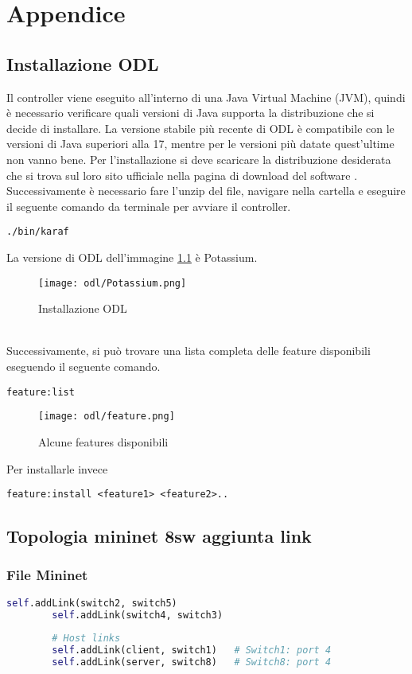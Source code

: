 \chapter{Appendice}

\section {Installazione ODL}
Il controller viene eseguito all'interno di una Java Virtual Machine (JVM), quindi è necessario verificare quali versioni di Java supporta la distribuzione che si decide di installare.
La versione stabile più recente di ODL è compatibile con le versioni di Java superiori alla 17, mentre per le versioni più datate quest'ultime non vanno bene. 
Per l'installazione si deve scaricare la distribuzione desiderata che si trova sul loro sito ufficiale nella pagina di download del software \cite{InstallODL}.
Successivamente è necessario fare l'unzip del file, navigare nella cartella e eseguire il seguente comando da terminale per avviare il controller.
\begin{lstlisting}[language=CLI]
./bin/karaf
\end{lstlisting}
La versione di ODL dell'immagine \ref{fig:installazione} è Potassium.
\begin{figure}[h]
    \centering
   \texttt{[image: odl/Potassium.png]}
    \caption{Installazione ODL}
    \label{fig:installazione}
\end{figure}
\\Successivamente, si può trovare una lista completa delle feature disponibili eseguendo il seguente comando.
\begin{lstlisting}[language=CLI]
feature:list
\end{lstlisting}
\begin{figure}[h]
    \centering
   \texttt{[image: odl/feature.png]}
    \caption{Alcune features disponibili}
    \label{fig:feature}
\end{figure}
Per installarle invece 
\begin{lstlisting}[language=CLI]
feature:install <feature1> <feature2>..
\end{lstlisting}

\section{Topologia mininet 8sw aggiunta link}
\label{cap:link}
\subsection{File Mininet}
\begin{lstlisting}[language=Python]
        self.addLink(switch2, switch5) 
        self.addLink(switch4, switch3)  
        
        # Host links
        self.addLink(client, switch1)   # Switch1: port 4
        self.addLink(server, switch8)   # Switch8: port 4
\end{lstlisting}
